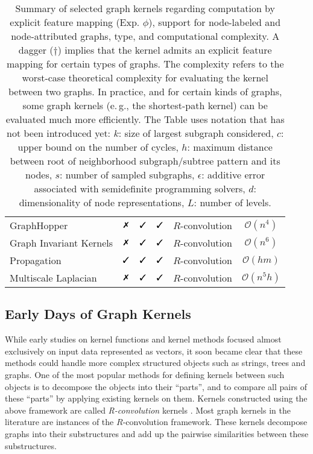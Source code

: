 \documentclass[twoside,11pt]{article}
\newcommand{\cmark}{\text{\ding{51}}}\newcommand{\xmark}{\text{\ding{55}}}
\newcommand{\eg}{e.\,g., }
\begin{document}
\begin{table}[t]
\begin{tabular}{l|c|c|c|c|c}
    GraphHopper & $\xmark$ & $\cmark$ & $\cmark$ & $R$-convolution & $\mathcal{O}(n^4)$ \\ 
    Graph Invariant Kernels & $\xmark$ & $\cmark$ & $\cmark$ & $R$-convolution & $\mathcal{O}(n^6)$ \\ 
    Propagation & $\cmark$ & $\cmark$ & $\cmark$ & $R$-convolution & $\mathcal{O}(hm)$ \\ 
    Multiscale Laplacian & $\xmark$ & $\cmark$ & $\cmark$ & $R$-convolution & $\mathcal{O}(n^5 h)$ \\ \hline
  \end{tabular}
\caption{Summary of selected graph kernels regarding computation by explicit feature mapping (Exp. $\phi$), support for node-labeled and node-attributed graphs, type, and computational complexity. A dagger ($\dagger$) implies that the kernel admits an explicit feature mapping for certain types of graphs. The complexity refers to the worst-case theoretical complexity for evaluating the kernel between two graphs. In practice, and for certain kinds of graphs, some graph kernels (\eg the shortest-path kernel) can be evaluated much more efficiently. The Table uses notation that has not been introduced yet: $k$: size of largest subgraph considered, $c$: upper bound on the number of cycles, $h$: maximum distance between root of neighborhood subgraph/subtree pattern and its nodes, $s$: number of sampled subgraphs, $\epsilon$: additive error associated with semidefinite programming solvers, $d$: dimensionality of node representations, $L$: number of levels.}
  \label{tab:comparison}
\end{table}

\subsection{Early Days of Graph Kernels}
While early studies on kernel functions and kernel methods focused almost exclusively on input data represented as vectors, it soon became clear that these methods could handle more complex structured objects such as strings, trees and graphs.
One of the most popular methods for defining kernels between such objects is to decompose the objects into their ``parts'', and to compare all pairs of these ``parts'' by applying existing kernels on them.
Kernels constructed using the above framework are called \textit{R-convolution} kernels .
Most graph kernels in the literature are instances of the $R$-convolution framework.
These kernels decompose graphs into their substructures and add up the pairwise similarities between these substructures.
\end{document}
